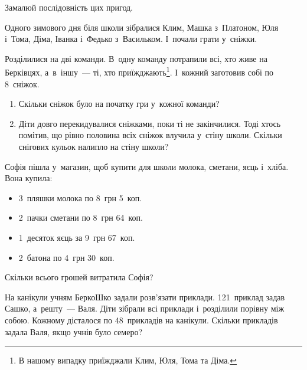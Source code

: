 Замалюй послідовність цих пригод.


\problem
Одного зимового дня біля школи зібралися Клим, Машка з~Платоном, Юля і~Тома,
Діма, Іванка і~Федько з~Васильком. І~почали грати у~сніжки.

Розділилися на дві команди. В~одну команду потрапили всі,
хто живе на Берківцях, а~в~іншу~--- ті, хто приїжджають\footnote{
  В нашому випадку приїжджали Клим, Юля, Тома та Діма.
}.
І~кожний заготовив собі по 8~сніжок.

\begin{enumerate}
  \item Скільки сніжок було на початку гри у~кожної команди?
  \item Діти довго перекидувалися сніжками, поки ті не закінчилися.
  Тоді хтось помітив, що рівно половина всіх сніжок влучила у~стіну школи.
  Скільки снігових кульок налипло на стіну школи?
\end{enumerate}


\problem
Софія пішла у~магазин, щоб купити для школи молока, сметани, яєць і~хліба.
Вона купила:
\begin{itemize}
  \item 3~пляшки молока по 8~грн 5~коп.
  \item 2~пачки сметани по 8~грн 64~коп.
  \item 1~десяток яєць за 9~грн 67~коп.
  \item 2~батона по 4~грн 30~коп.
\end{itemize}

Скільки всього грошей витратила Софія?


\problem
На канікули учням БеркоШко задали розв'язати приклади.
121~приклад задав Сашко, а~решту~--- Валя.
Діти зібрали всі приклади і~розділили порівну між собою.
Кожному дісталося по 48~прикладів на канікули.
Скільки прикладів задала Валя, якщо учнів було семеро?


